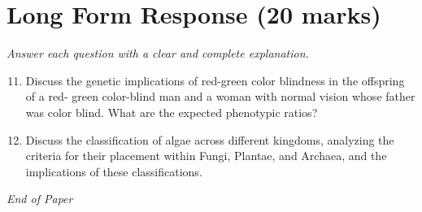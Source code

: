 \documentclass[12pt]{article}
\begin{document}
\section*{Long Form Response (20 marks)}
\textit{Answer each question with a clear and complete explanation.}
\begin{enumerate}[label=\arabic*.]
\setcounter{enumi}{10}
\item Discuss the genetic implications of red-green color blindness in the offspring of a red- green color-blind man and a woman with normal vision whose father was color blind. What are the expected phenotypic ratios?
\item Discuss the classification of algae across different kingdoms, analyzing the criteria for their placement within Fungi, Plantae, and Archaea, and the implications of these classifications.
\end{enumerate}

\vfill
\noindent\textit{End of Paper}
\end{document}
